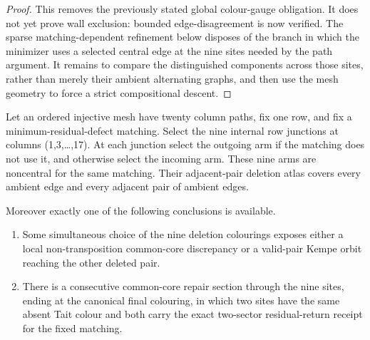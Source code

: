 \begin{proof}
This removes the previously stated global colour-gauge obligation.  It does
not yet prove wall exclusion: bounded edge-disagreement is now verified.  The
sparse matching-dependent refinement below disposes of the branch in which
the minimizer uses a selected central edge at the nine sites needed by the
path argument.  It remains to compare the distinguished components across
those sites, rather than merely their ambient alternating graphs, and then use
the mesh geometry to force a strict compositional descent.
\end{proof}

\begin{corollary}
\label{cor:sparse-noncentral-mesh-deletion-atlas}
Let an ordered injective mesh have twenty column paths, fix one row, and fix a
minimum-residual-defect matching.  Select the nine internal row junctions at
columns (1,3,\ldots,17).  At each junction select the outgoing arm if the
matching does not use it, and otherwise select the incoming arm.  These nine
arms are noncentral for the same matching.  Their adjacent-pair deletion
atlas covers every ambient edge and every adjacent pair of ambient edges.

Moreover exactly one of the following conclusions is available.
\begin{enumerate}
\item Some simultaneous choice of the nine deletion colourings exposes either
      a local non-transposition common-core discrepancy or a valid-pair Kempe
      orbit reaching the other deleted pair.
\item There is a consecutive common-core repair section through the nine
      sites, ending at the canonical final colouring, in which two sites have
      the same absent Tait colour and both carry the exact two-sector
      residual-return receipt for the fixed matching.
\end{enumerate}
\end{corollary}

